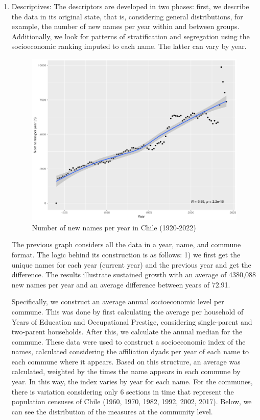 \begin{enumerate}
  \item Descriptives: The descriptors are developed in two phases: first, we describe the data in its original state, that is, considering general distributions, for example, the number of new names per year within and between groups. Additionally, we look for patterns of stratification and segregation using the socioeconomic ranking imputed to each name. The latter can vary by year.
\bigskip

\begin{figure}[H]
    \centering
    \includegraphics[width=13cm]{plot/new_names_yearII.png}
    \caption{Number of new names per year in Chile (1920-2022)}
    \label{}
\end{figure}

The previous graph considers all the data in a year, name, and commune format. The logic behind its construction is as follows: 1) we first get the unique names for each year (current year) and the previous year and get the difference. The results illustrate sustained growth with an average of 4380,088 new names per year and an average difference between years of 72.91.
\bigskip

Specifically, we construct an average annual socioeconomic level per commune. This was done by first calculating the average per household of Years of Education and Occupational Prestige, considering single-parent and two-parent households. After this, we calculate the annual median for the commune. These data were used to construct a socioeconomic index of the names, calculated considering the affiliation dyads per year of each name to each commune where it appears. Based on this structure, an average was calculated, weighted by the times the name appears in each commune by year. In this way, the index varies by year for each name. For the communes, there is variation considering only 6 sections in time that represent the population censuses of Chile (1960, 1970, 1982, 1992, 2002, 2017). Below, we can see the distribution of the measures at the community level.


\end{enumerate}
